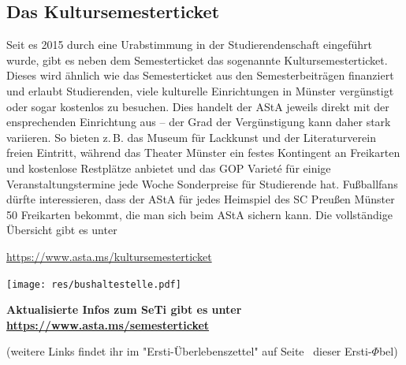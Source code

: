 \begin{multicols*}{2}
\subsection{Das Kultursemesterticket}
Seit es 2015 durch eine Urabstimmung in der Studierendenschaft eingeführt wurde, gibt es neben dem Semesterticket das sogenannte Kultursemesterticket. Dieses wird ähnlich wie das Semesterticket aus den Semesterbeiträgen finanziert und erlaubt Studierenden, viele kulturelle Einrichtungen in Münster vergünstigt oder sogar kostenlos zu besuchen. Dies handelt der AStA jeweils direkt mit der ensprechenden Einrichtung aus – der Grad der Vergünstigung kann daher stark variieren. So bieten z.\,B. das Museum für Lackkunst und der Literaturverein freien Eintritt, während das Theater Münster ein festes Kontingent an Freikarten und kostenlose Restplätze anbietet und das GOP Variet\'e für einige Veranstaltungstermine jede Woche Sonderpreise für Studierende hat. Fußballfans dürfte interessieren, dass der AStA für jedes Heimspiel des SC Preußen Münster 50 Freikarten bekommt, die man sich beim AStA sichern kann.
Die vollständige Übersicht gibt es unter
\vspace{-1ex}
\begin{center}
	\url{https://www.asta.ms/kultursemesterticket}
\end{center}

\smallskip

\begin{center}
	\texttt{[image: res/bushaltestelle.pdf]}

	{\bfseries
	Aktualisierte Infos zum SeTi gibt es unter\\
	\url{https://www.asta.ms/semesterticket}}
	
	(weitere Links findet ihr im "Ersti-Überlebenszettel" auf Seite~\pageref{dpü} dieser Ersti-$\Phi$bel)
\end{center}

\end{multicols*}
